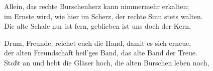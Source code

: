 \thestrophe Allein, das rechte Burschenherz kann nimmermehr erkalten; \\
im Ernste wird, wie hier im Scherz, der rechte Sinn stets walten. \\
Die alte Schale nur ist fern, geblieben ist uns doch der Kern, \\

\thestrophe Drum, Freunde, reichet euch die Hand, damit es sich erneue, \\
der alten Freundschaft heil'ges Band, das alte Band der Treue. \\
Stoßt an und hebt die Gläser hoch, die alten Burschen leben noch, \\
